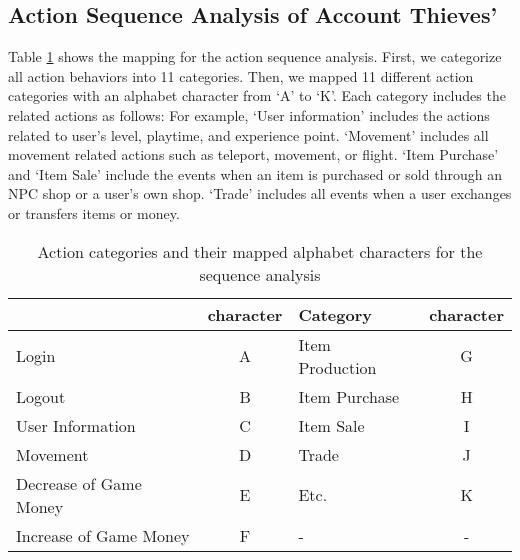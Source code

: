 \documentclass[conference]{IEEEtran}
\begin{document}
\subsection{Action Sequence Analysis of Account Thieves'}
Table \ref{table:table1} shows the mapping for the action sequence analysis. %
First, we categorize all action behaviors into 11 categories. Then, we mapped 11 different action categories with an alphabet character from `A' to `K'. Each category includes the related actions as follows: For example, `User information' includes the actions related to user's level, playtime, and experience point. `Movement' includes all movement related actions such as teleport, movement, or flight. `Item Purchase' and `Item Sale' include the events when an item is purchased or sold through an NPC shop or a user's own shop. `Trade' includes all events when a user exchanges or transfers items or money.

\begin{table}
\centering
\caption{Action categories and their mapped alphabet characters for the sequence analysis}
\label{table:table1} 

\begin{tabular}{|>{\centering}m{2cm}|c|>{\centering}m{2cm}|c| } \hline
 {\bfseries Category} & {\bfseries character} & {\bfseries Category }& {\bfseries character}\\ \hline 

 Login                              & A  & Item Production & G \\   \hline 
 Logout                            & B  & Item Purchase  & H \\   \hline 
 User Information               & C & Item Sale         & I \\   \hline
 Movement                       & D & Trade  & J \\   \hline 
 Decrease of Game Money & E & Etc. & K \\   \hline 
 Increase of Game Money & F & -                     & -\\   \hline 
\end{tabular} 
\end{table}
\end{document}
